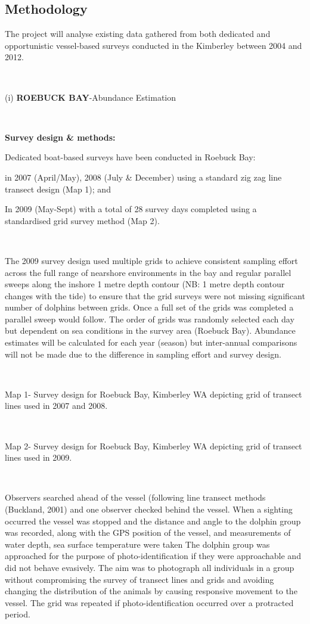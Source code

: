 \documentclass[version=last,
    paper=a4,                               %
    10pt,                                   %
    dvipsnames,
    oneside,                              %
    headings=openany,                       %
    open=any,
    BCOR=7mm,                               %
    DIV=15,     %
]{scrbook}
\begin{document}
\subsection*{Methodology}

The project will analyse existing data gathered from both dedicated and
opportunistic vessel-based surveys conducted in the Kimberley between
2004 and 2012.~

~

(i) \textbf{ROEBUCK BAY}-Abundance Estimation

\emph{~}

\textbf{Survey design \& methods:}

Dedicated boat-based surveys have been conducted in Roebuck Bay:

in 2007 (April/May), 2008 (July \& December) using a standard zig zag
line transect design (Map 1); and

In 2009 (May-Sept) with a total of 28 survey days completed using a
standardised grid survey method (Map 2).

~

The 2009 survey design used multiple grids to achieve consistent
sampling effort across the full range of nearshore environments in the
bay and regular parallel sweeps along the inshore 1 metre depth contour
(NB: 1 metre depth contour changes with the tide) to ensure that the
grid surveys were not missing significant number of dolphins between
grids. Once a full set of the grids was completed a parallel sweep would
follow. The order of grids was randomly selected each day but dependent
on sea conditions in the survey area (Roebuck Bay). Abundance estimates
will be calculated for each year (season) but inter-annual comparisons
will not be made due to the difference in sampling effort and survey
design.

~

Map 1- Survey design for Roebuck Bay, Kimberley WA depicting grid of
transect lines used in 2007 and 2008.

~

Map 2- Survey design for Roebuck Bay, Kimberley WA depicting grid of
transect lines used in 2009.

~

Observers searched ahead of the vessel (following line transect methods
(Buckland, 2001) and one observer checked behind the vessel. When a
sighting occurred the vessel was stopped and the distance and angle to
the dolphin group was recorded, along with the GPS position of the
vessel, and measurements of water depth, sea surface temperature were
taken The dolphin group was approached for the purpose of
photo-identification if they were approachable and did not behave
evasively. The aim was to photograph all individuals in a group without
compromising the survey of transect lines and grids and avoiding
changing the distribution of the animals by causing responsive movement
to the vessel. The grid was repeated if photo-identification occurred
over a protracted period.
\end{document}
